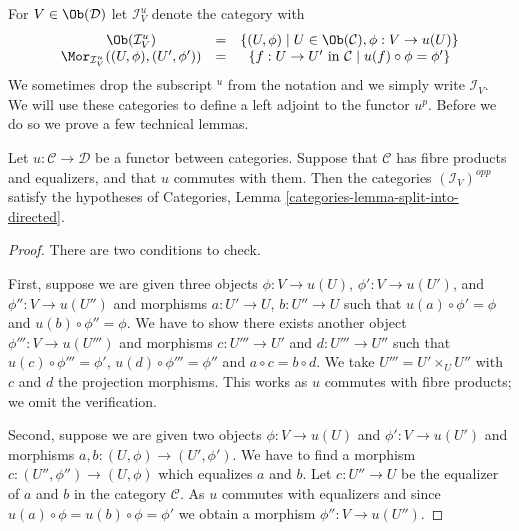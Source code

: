 \medskip\noindent
For $V \in \Ob(\mathcal{D})$ let $\mathcal{I}^u_V$
denote the category with
\begin{equation}
\label{equation-colim-category}
\begin{matrix}
\Ob(\mathcal{I}^u_V)
&
=
&
\{
(U, \phi)
\mid
U \in \Ob(\mathcal{C}),
\phi : V \to u(U)
\}
\\
\Mor_{\mathcal{I}^u_V}((U, \phi), (U', \phi'))
&
=
&
\{
f : U \to U' \text{ in }\mathcal{C}
\mid
u(f) \circ \phi = \phi'
\}
\end{matrix}
\end{equation}
We sometimes drop the subscript ${}^u$ from the notation and we simply write
$\mathcal{I}_V$.
We will use these categories to define a left adjoint to the functor $u^p$.
Before we do so we prove a few technical lemmas.

\begin{lemma}
\label{lemma-almost-directed}
Let $u : \mathcal{C} \to \mathcal{D}$ be a functor between categories.
Suppose that $\mathcal{C}$ has fibre products and equalizers, and that
$u$ commutes with them. Then the categories $(\mathcal{I}_V)^{opp}$
satisfy the hypotheses of
Categories, Lemma \ref{categories-lemma-split-into-directed}.
\end{lemma}

\begin{proof}
There are two conditions to check.

\medskip\noindent
First, suppose we are given three objects
$\phi : V \to u(U)$, $\phi' : V \to u(U')$, and $\phi'' : V \to u(U'')$
and morphisms $a : U' \to U$, $b : U'' \to U$ such that
$u(a) \circ \phi' = \phi$ and $u(b) \circ \phi'' = \phi$.
We have to show there exists another object $\phi''' : V \to u(U''')$
and morphisms $c : U''' \to U'$ and $d : U''' \to U''$ such that
$u(c) \circ \phi''' = \phi'$, $u(d) \circ \phi''' = \phi''$ and
$a \circ c = b \circ d$. We take $U''' = U' \times_U U''$
with $c$ and $d$ the projection morphisms. This works as $u$ commutes
with fibre products; we omit the verification.

\medskip\noindent
Second, suppose we are given two objects
$\phi : V \to u(U)$ and $\phi' : V \to u(U')$
and morphisms $a, b : (U, \phi) \to (U', \phi')$.
We have to find a morphism $c : (U'', \phi'') \to (U, \phi)$
which equalizes $a$ and $b$. Let $c : U'' \to U$ be the equalizer of
$a$ and $b$ in the category $\mathcal{C}$. As $u$ commutes
with equalizers and since $u(a) \circ \phi = u(b) \circ \phi = \phi'$
we obtain a morphism $\phi'' : V \to u(U'')$.
\end{proof}

